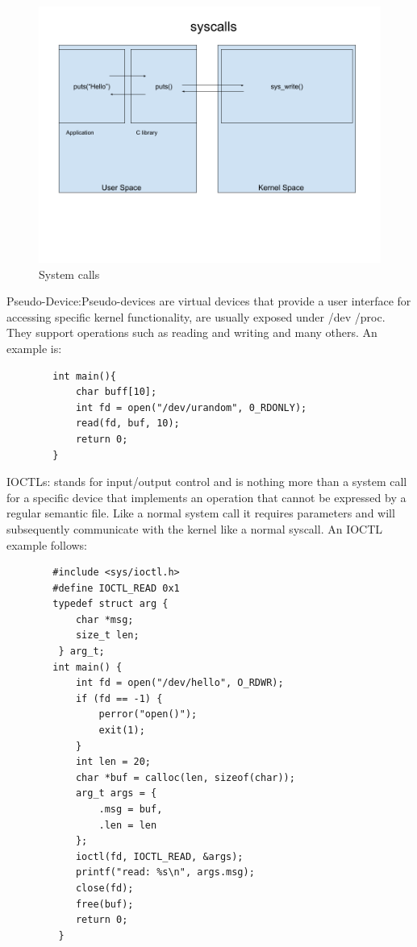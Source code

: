     \begin{figure}[htbp]
        \centering
        \includegraphics[width=0.8\linewidth]{Images/syscall.png}
        \caption{System calls}
        \label{fig:enter-label}
    \end{figure}
    \clearpage
    Pseudo-Device:Pseudo-devices are virtual devices that provide a user interface for accessing specific kernel functionality, are usually exposed under /dev /proc.\newline
    They support operations such as reading and writing and many others.
    An example is:
    \begin{verbatim}
        int main(){
            char buff[10];
            int fd = open("/dev/urandom", 0_RDONLY);
            read(fd, buf, 10);
            return 0;
        }
    \end{verbatim}
    IOCTLs: stands for input/output control and is nothing more than a system call for a specific device that implements an operation that cannot be expressed by a regular semantic file.\newline
    Like a normal system call it requires parameters and will subsequently communicate with the kernel like a normal syscall.\newline
    An IOCTL example follows: 
    \begin{verbatim}
        #include <sys/ioctl.h> 
        #define IOCTL_READ 0x1 
        typedef struct arg { 
            char *msg; 
            size_t len;
         } arg_t; 
        int main() { 
            int fd = open("/dev/hello", O_RDWR); 
            if (fd == -1) { 
                perror("open()"); 
                exit(1); 
            } 
            int len = 20; 
            char *buf = calloc(len, sizeof(char)); 
            arg_t args = { 
                .msg = buf, 
                .len = len 
            }; 
            ioctl(fd, IOCTL_READ, &args); 
            printf("read: %s\n", args.msg); 
            close(fd); 
            free(buf); 
            return 0; 
         }
    
    \end{verbatim}
